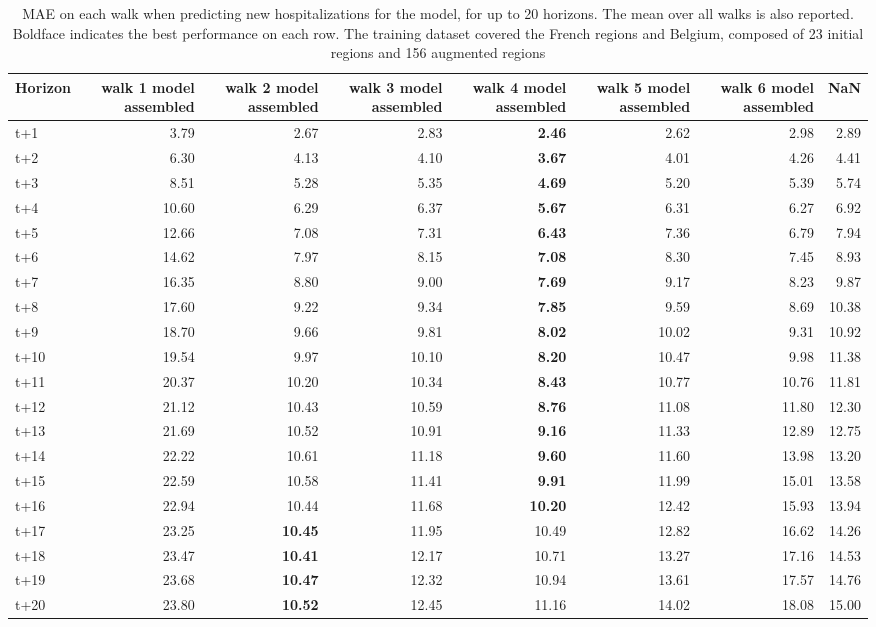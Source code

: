 \begin{table}[H]
\centering
\caption{MAE on each walk when predicting new hospitalizations for the model, for up to 20 horizons. The mean over all walks is also reported. Boldface indicates the best performance on each row. The training dataset covered the French regions and Belgium, composed of 23 initial regions and 156 augmented regions }
\label{tab:MAE_walk_assembly}
\begin{tabular}{lrrrrrrr}
\toprule
Horizon &  walk 1 model assembled &  walk 2 model assembled &  walk 3 model assembled &  walk 4 model assembled &  walk 5 model assembled &  walk 6 model assembled &   NaN \\
\midrule
t+1  & 3.79  & 2.67  & 2.83  & \textbf{2.46}  & 2.62  & 2.98  & 2.89  \\
t+2  & 6.30  & 4.13  & 4.10  & \textbf{3.67}  & 4.01  & 4.26  & 4.41  \\
t+3  & 8.51  & 5.28  & 5.35  & \textbf{4.69}  & 5.20  & 5.39  & 5.74  \\
t+4  & 10.60  & 6.29  & 6.37  & \textbf{5.67}  & 6.31  & 6.27  & 6.92  \\
t+5  & 12.66  & 7.08  & 7.31  & \textbf{6.43}  & 7.36  & 6.79  & 7.94  \\
t+6  & 14.62  & 7.97  & 8.15  & \textbf{7.08}  & 8.30  & 7.45  & 8.93  \\
t+7  & 16.35  & 8.80  & 9.00  & \textbf{7.69}  & 9.17  & 8.23  & 9.87  \\
t+8  & 17.60  & 9.22  & 9.34  & \textbf{7.85}  & 9.59  & 8.69  & 10.38  \\
t+9  & 18.70  & 9.66  & 9.81  & \textbf{8.02}  & 10.02  & 9.31  & 10.92  \\
t+10  & 19.54  & 9.97  & 10.10  & \textbf{8.20}  & 10.47  & 9.98  & 11.38  \\
t+11  & 20.37  & 10.20  & 10.34  & \textbf{8.43}  & 10.77  & 10.76  & 11.81  \\
t+12  & 21.12  & 10.43  & 10.59  & \textbf{8.76}  & 11.08  & 11.80  & 12.30  \\
t+13  & 21.69  & 10.52  & 10.91  & \textbf{9.16}  & 11.33  & 12.89  & 12.75  \\
t+14  & 22.22  & 10.61  & 11.18  & \textbf{9.60}  & 11.60  & 13.98  & 13.20  \\
t+15  & 22.59  & 10.58  & 11.41  & \textbf{9.91}  & 11.99  & 15.01  & 13.58  \\
t+16  & 22.94  & 10.44  & 11.68  & \textbf{10.20}  & 12.42  & 15.93  & 13.94  \\
t+17  & 23.25  & \textbf{10.45}  & 11.95  & 10.49  & 12.82  & 16.62  & 14.26  \\
t+18  & 23.47  & \textbf{10.41}  & 12.17  & 10.71  & 13.27  & 17.16  & 14.53  \\
t+19  & 23.68  & \textbf{10.47}  & 12.32  & 10.94  & 13.61  & 17.57  & 14.76  \\
t+20  & 23.80  & \textbf{10.52}  & 12.45  & 11.16  & 14.02  & 18.08  & 15.00  \\

\bottomrule
\end{tabular}
\end{table}
